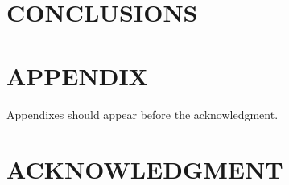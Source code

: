 \documentclass[letterpaper, 10 pt, conference]{ieeeconf}  %
\begin{document}
\section{CONCLUSIONS}
\addtolength{\textheight}{-12cm}   %







\section*{APPENDIX}

Appendixes should appear before the acknowledgment.

\section*{ACKNOWLEDGMENT}







\end{document}

